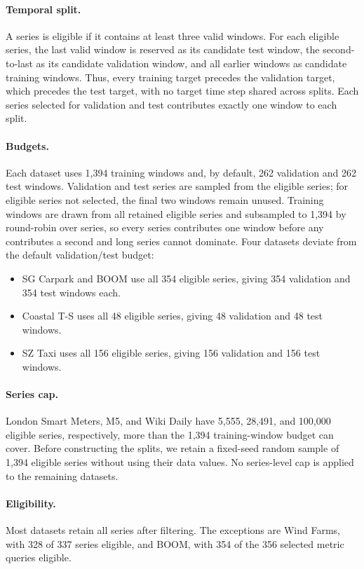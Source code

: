 \documentclass{article} %
\begin{document}
\paragraph{Temporal split.}
A series is eligible if it contains at least three valid windows. For each eligible series, the last valid window is reserved as its candidate test window, the second-to-last as its candidate validation window, and all earlier windows as candidate training windows. Thus, every training target precedes the validation target, which precedes the test target, with no target time step shared across splits. Each series selected for validation and test contributes exactly one window to each split.

\paragraph{Budgets.}
Each dataset uses 1,394 training windows and, by default, 262 validation and 262 test windows. Validation and test series are sampled from the eligible series; for eligible series not selected, the final two windows remain unused. Training windows are drawn from all retained eligible series and subsampled to 1,394 by round-robin over series, so every series contributes one window before any contributes a second and long series cannot dominate. Four datasets deviate from the default validation/test budget:
\begin{itemize}[leftmargin=*]
  \item SG Carpark and BOOM use all 354 eligible series, giving 354 validation and 354 test windows each.
  \item Coastal T-S uses all 48 eligible series, giving 48 validation and 48 test windows.
  \item SZ Taxi uses all 156 eligible series, giving 156 validation and 156 test windows.
\end{itemize}

\paragraph{Series cap.}
London Smart Meters, M5, and Wiki Daily have 5,555, 28,491, and 100,000 eligible series, respectively, more than the 1,394 training-window budget can cover. Before constructing the splits, we retain a fixed-seed random sample of 1,394 eligible series without using their data values. No series-level cap is applied to the remaining datasets.

\paragraph{Eligibility.}
Most datasets retain all series after filtering. The exceptions are Wind Farms, with 328 of 337 series eligible, and BOOM, with 354 of the 356 selected metric queries eligible.
\end{document}
